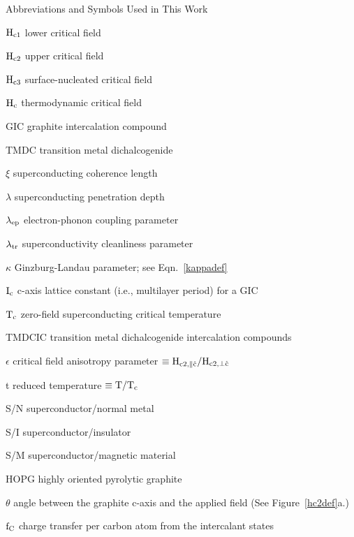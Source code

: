 \clearpage
\pagestyle{headings}
\begin{Large}
\begin{center}
\begin{bf}
Abbreviations and Symbols Used in This Work
\end{bf}
\end{center}
\end{Large}
\begin{list}{}{\setlength{\rightmargin}{\leftmargin}}
\item[$\rm H_{c1}$]  lower critical field 
\item[$\rm H_{c2}$]  upper critical field 
\item[$\rm H_{c3}$] surface-nucleated critical field 
\item[$\rm H_c$]    thermodynamic critical field 
\item[GIC]  graphite intercalation compound
\item[TMDC] transition metal dichalcogenide
\item[$\xi$] superconducting coherence length 
\item[$\lambda$] superconducting penetration depth
\item[$\rm \lambda_{ep}$] electron-phonon coupling parameter
\item[$\rm \lambda_{tr}$] superconductivity cleanliness parameter
\item[$\kappa$] Ginzburg-Landau parameter; see Eqn.~\ref{kappadef}
\item[$\rm I_c$] c-axis lattice constant (i.e., multilayer period) for a GIC
\item[$\rm T_c$] zero-field superconducting critical temperature
\item[TMDCIC] transition metal dichalcogenide intercalation compounds
\item[$\epsilon$] critical field anisotropy parameter $\rm \equiv
H_{c2,\parallel \hat{c}}/H_{c2, \perp \hat{c}} $
\item[t] reduced temperature $\rm \equiv T/T_c$
\item[S/N] superconductor/normal metal
\item[S/I] superconductor/insulator
\item[S/M] superconductor/magnetic material
\item[HOPG] highly oriented pyrolytic graphite
\item[$\theta$] angle between the graphite c-axis and the applied field (See Figure~\ref{hc2def}a.)
\item[$\rm f_C$] charge transfer per carbon atom from the intercalant states

\end{list}
